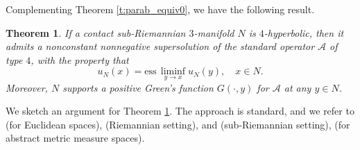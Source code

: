 \documentclass[10pt,letterpaper]{amsart}
\newtheorem{thm}{Theorem}
\theoremstyle{definition}
\numberwithin{thm}{subsection}
\numberwithin{equation}{section}
\begin{document}
Complementing Theorem \ref{t:parab_equiv0}, we have the following
result.

\begin{thm}\label{t:parab_equiv}
If a contact sub-Riemannian $3$-manifold $N$ is $4$-hyperbolic,
then it admits a nonconstant nonnegative supersolution of the
standard operator $\mathcal A$ of type $4$, with the property that
\begin{equation}\label{eq:lsc_reg_onN}
u_N(x) = \mathrm{ess}\,\liminf_{y\to x}u_N(y),\quad x\in N.
\end{equation}
Moreover, $N$  supports a positive Green's function $G(\cdot,y)$
for $\mathcal A$ at any $y\in N$.
\end{thm}

We sketch an argument for Theorem \ref{t:parab_equiv}. The
approach is standard, and we refer to \cite[Theorem
9.22]{MR1207810} (for Euclidean spaces), \cite[Theorem
3.27]{HolDiss} (Riemannian setting), \cite[Section 3.2]{MR1878317}
and \cite[Theorems 3 and 4]{MR1672629} (sub-Riemannian setting),
\cite[Theorem 3.14]{MR1940332} (for abstract metric measure
spaces).
\end{document}
